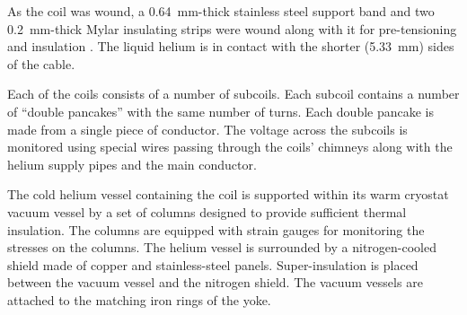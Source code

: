 As the coil was wound, a 0.64~mm-thick stainless steel support band
and two 0.2~mm-thick Mylar insulating strips were wound along with it
for pre-tensioning and insulation%
. 
The liquid helium is in contact with the shorter (5.33~mm) sides of
the cable.

Each of the coils consists of a number of subcoils. Each subcoil
contains a number of ``double pancakes'' with the same number of
turns.
Each double pancake is made from a single piece of conductor. The
voltage across the subcoils is monitored using special wires passing
through the coils' chimneys along with the helium supply pipes and the
main conductor.

The cold helium vessel containing the coil is supported within its
warm cryostat vacuum vessel by a set of columns designed to provide
sufficient thermal insulation. The columns are equipped with strain
gauges for monitoring the stresses on the columns. The helium vessel
is surrounded by a nitrogen-cooled shield made of copper and stainless-steel panels.
Super-insulation is placed between the vacuum vessel and the nitrogen
shield.  The vacuum vessels are attached to the matching iron rings of
the yoke.

